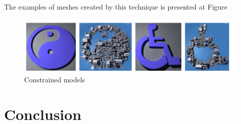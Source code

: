\documentclass[b5paper,twoside,11pt]{article}
\renewcommand{\figurename}{Figure}
\begin{document}
The examples of meshes created by this technique is presented at \figurename

\begin{figure}[h]
	\centering
	\includegraphics[width=0.9	\textwidth]{exampleMS}
	\caption{Constrained models}
	\label{exampleMS}
\end{figure}

\newpage
\section{Conclusion}

 

\end{document}
